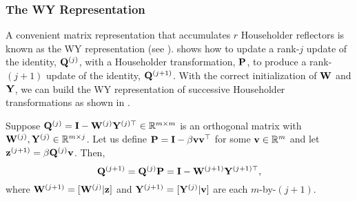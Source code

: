 \subsubsection{The WY Representation}
A convenient matrix representation that accumulates $r$ Householder reflectors is known as the WY representation (see \cite{Bischof1987,golub2013matrix}).
 shows how to update a rank-$j$ update of the identity, $\mathbf{Q}^{(j)}$, with a Householder transformation, $\mathbf{P}$, to produce a rank-$(j+1)$ update of the identity, $\mathbf{Q}^{(j+1)}$. 
With the correct initialization of $\mathbf{W}$ and $\mathbf{Y}$, we can build the WY representation of successive Householder transformations as shown in . 
\begin{lemma}\label{lem:WY}
	Suppose $\mathbf{Q}^{(j)}=\mathbf{I}-\mathbf{W}^{(j)}\mathbf{Y}^{(j)\top}\in\mathbb{R}^{m\times m}$ is an orthogonal matrix with $\mathbf{W}^{(j)},\mathbf{Y}^{(j)}\in\mathbb{R}^{m\times j}$.
	Let us define $\mathbf{P}=\mathbf{I}-\beta\mathbf{vv}^{\top}$ for some $\mathbf{v}\in\mathbb{R}^m$ and let $\mathbf{z}^{(j+1)}=\beta\mathbf{Q}^{(j)}\mathbf{v}$.
	Then, \[\mathbf{Q}^{(j+1)} = \mathbf{Q}^{(j)}\mathbf{P} = \mathbf{I} - \mathbf{W}^{(j+1)}\mathbf{Y}^{(j+1)\top}, \]where $ \mathbf{W}^{(j+1)} =[\mathbf{W}^{(j)}|\mathbf{z}]$ and $ \mathbf{Y}^{(j+1)}=[\mathbf{Y}^{(j)}|\mathbf{v}]$ are each $m$-by-$(j+1)$. 
\end{lemma}

